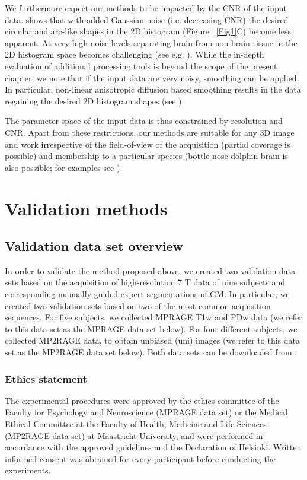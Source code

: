 We furthermore expect our methods to be impacted by the CNR of the input data.  shows that with added Gaussian noise (i.e. decreasing CNR) the desired circular and arc-like shapes in the 2D histogram (Figure ~\ref{Fig1}C) become less apparent. At very high noise levels separating brain from non-brain tissue in the 2D histogram space becomes challenging (see e.g. ). While the in-depth evaluation of additional processing tools is beyond the scope of the present chapter, we note that if the input data are very noisy, smoothing can be applied. In particular, non-linear anisotropic diffusion based smoothing \parencite{Weickert1998, Mirebeau2015} results in the data regaining the desired 2D histogram shapes (see ).

The parameter space of the input data is thus constrained by resolution and CNR. Apart from these restrictions, our methods are suitable for any 3D image and work irrespective of the field-of-view of the acquisition (partial coverage is possible) and membership to a particular species (bottle-nose dolphin brain is also possible; for examples see ).

\section{Validation methods} \label{ValidationMethods}
\subsection{Validation data set overview}
In order to validate the method proposed above, we created two validation data sets based on the acquisition of high-resolution 7 T data of nine subjects and corresponding manually-guided expert segmentations of GM. In particular, we created two validation sets based on two of the most common acquisition sequences. For five subjects, we collected MPRAGE T1w and PDw data (we refer to this data set as the MPRAGE data set below). For four different subjects, we collected MP2RAGE data, to obtain unbiased (uni) images (we refer to this data set as the MP2RAGE data set below). Both data sets can be downloaded from \cite{shared_dataset}.

\subsubsection{Ethics statement}
The experimental procedures were approved by the ethics committee of the Faculty for Psychology and Neuroscience (MPRAGE data set) or the Medical Ethical Committee at the Faculty of Health, Medicine and Life Sciences (MP2RAGE data set) at Maastricht University, and were performed in accordance with the approved guidelines and the Declaration of Helsinki. Written informed consent was obtained for every participant before conducting the experiments.

